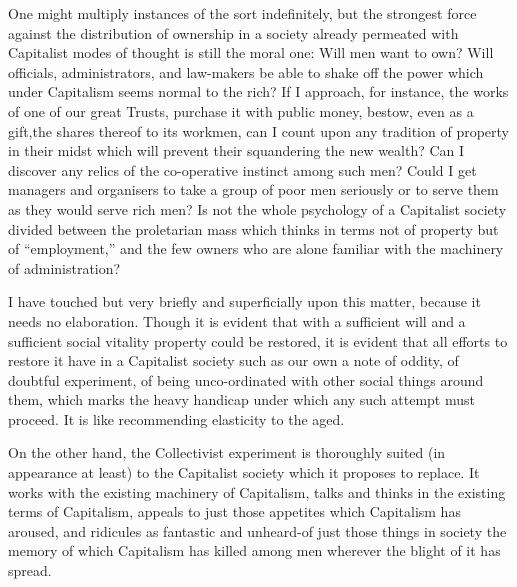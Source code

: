 \documentclass{book}
\begin{document}
One might multiply instances of the sort indefinitely, but the strongest force against the distribution of ownership in a society already permeated with Capitalist modes of thought is still the moral one: Will men want to own? Will officials, administrators, and law-makers be able to shake off the power which under Capitalism seems normal to the rich? If I approach, for instance, the works of one of our great Trusts, purchase it with public money, bestow, even as a gift,the shares thereof to its workmen, can I count upon any tradition of property in their midst which will prevent their squandering the new wealth? Can I discover any relics of the co-operative instinct among such men? Could I get managers and organisers to take a group of poor men seriously or to serve them as they would serve rich men? Is not the whole psychology of a Capitalist society divided between the proletarian mass which thinks in terms not of property but of “employment,” and the few owners who are alone familiar with the machinery of administration?

I have touched but very briefly and superficially upon this matter, because it needs no elaboration. Though it is evident that with a sufficient will and a sufficient social vitality property could be restored, it is evident that all efforts to restore it have in a Capitalist society such as our own a note of oddity, of doubtful experiment, of being unco-ordinated with other social things around them, which marks the heavy handicap under which any such attempt must proceed. It is like recommending elasticity to the aged.

On the other hand, the Collectivist experiment is thoroughly suited (in appearance at least) to the Capitalist society which it proposes to replace. It works with the existing machinery of Capitalism, talks and thinks in the existing terms of Capitalism, appeals to just those appetites which Capitalism has aroused, and ridicules as fantastic and unheard-of just those things in society the memory of which Capitalism has killed among men wherever the blight of it has spread.
\end{document}
